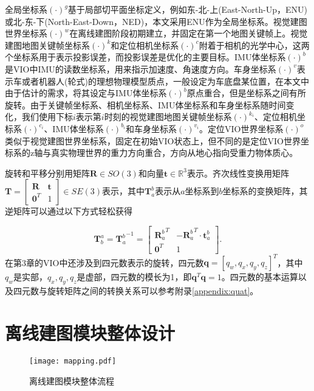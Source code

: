 全局坐标系$(\cdot)^{g}$基于局部切平面坐标定义，例如东-北-上(East-North-Up，ENU)或北-东-下(North-East-Down，NED)，本文采用ENU作为全局坐标系。视觉建图世界坐标系$(\cdot)^{w}$在离线建图阶段初期建立，并固定在第一个地图关键帧上。视觉建图地图关键帧坐标系$(\cdot)^{k}$和定位相机坐标系$(\cdot)^{c}$附着于相机的光学中心，这两个坐标系用于表示投影误差，而投影误差是优化的主要目标。IMU体坐标系$(\cdot)^{b}$是VIO中IMU的读数坐标系，用来指示加速度、角速度方向。车身坐标系$(\cdot)^{v}$表示车或者机器人(轮式)的理想物理模型质点，一般设定为车底盘某位置，在本文中由于估计的需求，将其设定与IMU体坐标系$(\cdot)^{b}$原点重合，但是坐标系之间有所旋转。由于关键帧坐标系、相机坐标系、IMU体坐标系和车身坐标系随时间变化，我们使用下标$i$表示第$i$时刻的视觉建图地图关键帧坐标系$(\cdot)^{k_i}$、定位相机坐标系$(\cdot)^{c_i}$、IMU体坐标系$(\cdot)^{b_i}$和车身坐标系$(\cdot)^{v_i}$。定位VIO世界坐标系$(\cdot)^{o}$类似于视觉建图世界坐标系，固定在初始VIO状态上，但不同的是定位VIO世界坐标系的z轴与真实物理世界的重力方向重合，方向从地心指向受重力物体质心。

旋转和平移分别用矩阵$\symbf{R} \in SO(3)$和向量$\symbf{t} \in \mathbb{R}^{3}$表示。齐次线性变换用矩阵$\symbf{T} = \begin{bmatrix} \symbf{R} & \symbf{t} \\ \symbf{0}^T & 1 \end{bmatrix} \in SE(3)$表示，其中$\symbf{T}_{a}^{b}$表示从$a$坐标系到$b$坐标系的变换矩阵，其逆矩阵可以通过以下方式轻松获得

\begin{equation}
  \symbf{T}^a_b = {\symbf{T}_a^b}^{-1} = \begin{bmatrix} {\symbf{R}_a^b}^T & -{\symbf{R}_a^b}^T\cdot\symbf{t}_a^b \\ \symbf{0}^T & 1 \end{bmatrix}.
\end{equation}
在第3章的VIO中还涉及到四元数表示的旋转，四元数$\symbf{q} = [q_w, q_x, q_y, q_z]^T$，其中$q_w$是实部，$q_x, q_y, q_z$是虚部，四元数的模长为1，即$\symbf{q}^T\symbf{q} = 1$。四元数的基本运算以及四元数与旋转矩阵之间的转换关系可以参考附录\ref{appendix:quat}。

\section{离线建图模块整体设计}

\begin{figure}
  \centering
  \texttt{[image: mapping.pdf]}
  \caption{离线建图模块整体流程}
  \label{fig:mapping}
\end{figure}


